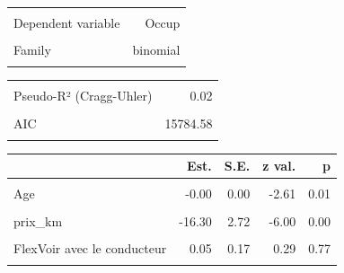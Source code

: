 \documentclass[
]{book}
\begin{document}
\begin{table}[!h]
\centering
\begin{tabular}{lr}
\toprule
\cellcolor{gray!6}{Observations} & \cellcolor{gray!6}{11719 (1586 missing obs. deleted)}\\
Dependent variable & Occup\\
\cellcolor{gray!6}{Type} & \cellcolor{gray!6}{Generalized linear model}\\
Family & binomial\\
\cellcolor{gray!6}{Link} & \cellcolor{gray!6}{logit}\\
\bottomrule
\end{tabular}
\end{table} \begin{table}[!h]
\centering
\begin{tabular}{lr}
\toprule
\cellcolor{gray!6}{$\chi^2$(11)} & \cellcolor{gray!6}{106.04}\\
Pseudo-R² (Cragg-Uhler) & 0.02\\
\cellcolor{gray!6}{Pseudo-R² (McFadden)} & \cellcolor{gray!6}{0.01}\\
AIC & 15784.58\\
\cellcolor{gray!6}{BIC} & \cellcolor{gray!6}{15873.00}\\
\bottomrule
\end{tabular}
\end{table} \begin{table}[!h]
\centering
\begin{threeparttable}
\begin{tabular}{lrrrr}
\toprule
  & Est. & S.E. & z val. & p\\
\midrule
\cellcolor{gray!6}{(Intercept)} & \cellcolor{gray!6}{0.07} & \cellcolor{gray!6}{0.56} & \cellcolor{gray!6}{0.13} & \cellcolor{gray!6}{0.90}\\
Age & -0.00 & 0.00 & -2.61 & 0.01\\
\cellcolor{gray!6}{log(Distance + 1)} & \cellcolor{gray!6}{0.11} & \cellcolor{gray!6}{0.04} & \cellcolor{gray!6}{2.79} & \cellcolor{gray!6}{0.01}\\
prix\_km & -16.30 & 2.72 & -6.00 & 0.00\\
\cellcolor{gray!6}{FlexPas d'indication} & \cellcolor{gray!6}{0.05} & \cellcolor{gray!6}{0.04} & \cellcolor{gray!6}{1.20} & \cellcolor{gray!6}{0.23}\\
\addlinespace
FlexVoir avec le conducteur & 0.05 & 0.17 & 0.29 & 0.77\\
\cellcolor{gray!6}{DetourDe 15 minutes max} & \cellcolor{gray!6}{-0.01} & \cellcolor{gray!6}{0.04} & \cellcolor{gray!6}{-0.24} & \cellcolor{gray!6}{0.81}\\

\end{tabular}
\end{threeparttable}
\end{table}
\end{document}
